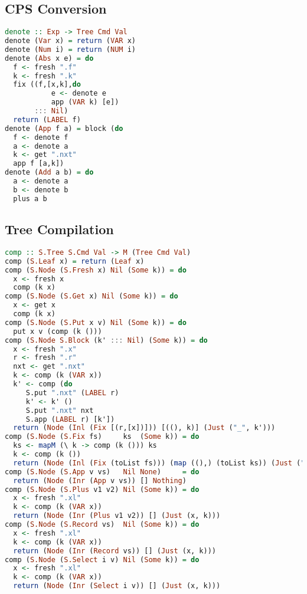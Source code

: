 \subsection{\label{subsection:cpsconvert}CPS Conversion}
\begin{lstlisting}[language=Haskell]
denote :: Exp -> Tree Cmd Val
denote (Var x) = return (VAR x)
denote (Num i) = return (NUM i)
denote (Abs x e) = do
  f <- fresh ".f"
  k <- fresh ".k"
  fix ((f,[x,k],do
           e <- denote e
           app (VAR k) [e])
       ::: Nil)
  return (LABEL f)
denote (App f a) = block (do
  f <- denote f
  a <- denote a
  k <- get ".nxt"
  app f [a,k])
denote (Add a b) = do
  a <- denote a
  b <- denote b
  plus a b
\end{lstlisting}
\subsection{\label{subsection:semtosyn}Tree Compilation}
\begin{lstlisting}[language=Haskell]
comp :: S.Tree S.Cmd Val -> M (Tree Cmd Val)
comp (S.Leaf x) = return (Leaf x)
comp (S.Node (S.Fresh x) Nil (Some k)) = do
  x <- fresh x
  comp (k x)
comp (S.Node (S.Get x) Nil (Some k)) = do
  x <- get x
  comp (k x)
comp (S.Node (S.Put x v) Nil (Some k)) = do
  put x v (comp (k ()))
comp (S.Node S.Block (k' ::: Nil) (Some k)) = do
  x <- fresh ".x"
  r <- fresh ".r"
  nxt <- get ".nxt"
  k <- comp (k (VAR x))
  k' <- comp (do
     S.put ".nxt" (LABEL r)
     k' <- k' ()
     S.put ".nxt" nxt
     S.app (LABEL r) [k'])
  return (Node (Inl (Fix [(r,[x])])) [((), k)] (Just ("_", k')))
comp (S.Node (S.Fix fs)     ks  (Some k)) = do
  ks <- mapM (\ k -> comp (k ())) ks
  k <- comp (k ())
  return (Node (Inl (Fix (toList fs))) (map ((),) (toList ks)) (Just ("_", k)))
comp (S.Node (S.App v vs)   Nil None)     = do
  return (Node (Inr (App v vs)) [] Nothing)
comp (S.Node (S.Plus v1 v2) Nil (Some k)) = do
  x <- fresh ".xl"
  k <- comp (k (VAR x))
  return (Node (Inr (Plus v1 v2)) [] (Just (x, k)))
comp (S.Node (S.Record vs)  Nil (Some k)) = do
  x <- fresh ".xl"
  k <- comp (k (VAR x))
  return (Node (Inr (Record vs)) [] (Just (x, k)))
comp (S.Node (S.Select i v) Nil (Some k)) = do
  x <- fresh ".xl"
  k <- comp (k (VAR x))
  return (Node (Inr (Select i v)) [] (Just (x, k)))
\end{lstlisting}
